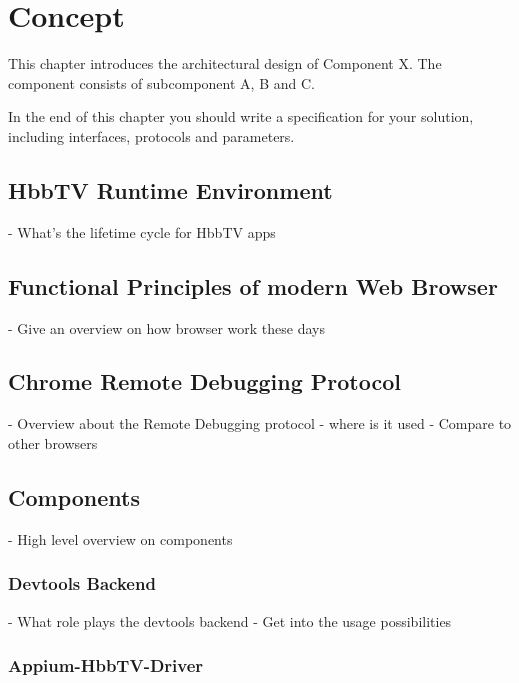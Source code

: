 \chapter{Concept\label{cha:chapter4}}
This chapter introduces the architectural design of Component X. The component consists of
subcomponent A, B and C.

In the end of this chapter you should write a specification for your solution, including
interfaces, protocols and parameters.

\section{HbbTV Runtime Environment\label{sec:hbbtvruntimeenvironment}}

- What's the lifetime cycle for HbbTV apps

\section{Functional Principles of modern Web Browser\label{sec:howbrowserwork}}

- Give an overview on how browser work these days

\section{Chrome Remote Debugging Protocol\label{sec:crdp}}

- Overview about the Remote Debugging protocol
- where is it used
- Compare to other browsers

\section{Components\label{sec:components}}

- High level overview on components

\subsection{Devtools Backend\label{sec:devtoolsbackend}}

- What role plays the devtools backend
- Get into the usage possibilities

\subsection{Appium-HbbTV-Driver\label{sec:appiumhbbtvdriver}}

